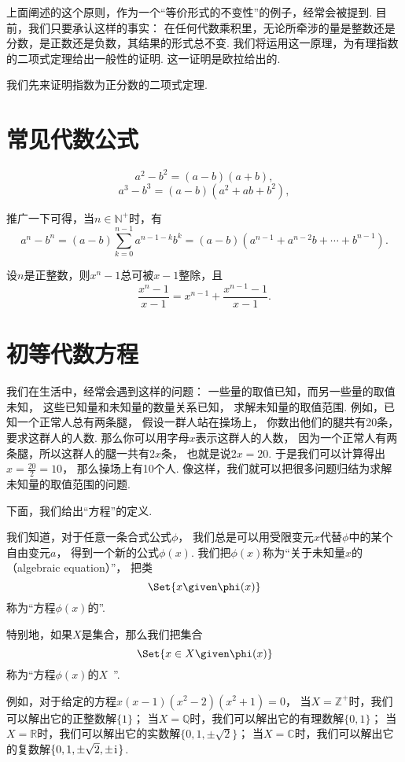 上面阐述的这个原则，作为一个“等价形式的不变性”的例子，经常会被提到.
目前，我们只要承认这样的事实：
在任何代数乘积里，无论所牵涉的量是整数还是分数，是正数还是负数，其结果的形式总不变.
我们将运用这一原理，为有理指数的二项式定理给出一般性的证明.
这一证明是欧拉给出的.

我们先来证明指数为正分数的二项式定理.

\section{常见代数公式}

\begin{theorem}
\[
a^2 - b^2 = (a-b)(a+b),
\]\[
a^3 - b^3 = (a-b)(a^2+ab+b^2),
\]

推广一下可得，当\(n \in \mathbb{N}^+\)时，有\[
a^n - b^n = (a-b) \sum_{k=0}^{n-1}{a^{n-1-k} b^k}
= (a-b)(a^{n-1} + a^{n-2} b + \dotsb + b^{n-1}).
\]
\end{theorem}

设\(n\)是正整数，则\(x^n-1\)总可被\(x-1\)整除，且\[
	\frac{x^n-1}{x-1}
	= x^{n-1} + \frac{x^{n-1}-1}{x-1}.
\]

\section{初等代数方程}
我们在生活中，经常会遇到这样的问题：
一些量的取值已知，而另一些量的取值未知，
这些已知量和未知量的数量关系已知，
求解未知量的取值范围.
例如，已知一个正常人总有两条腿，
假设一群人站在操场上，
你数出他们的腿共有20条，
要求这群人的人数.
那么你可以用字母\(x\)表示这群人的人数，
因为一个正常人有两条腿，所以这群人的腿一共有\(2x\)条，
也就是说\(2x=20\).
于是我们可以计算得出\(x=\frac{20}{2}=10\)，
那么操场上有10个人.
像这样，我们就可以把很多问题归结为求解未知量的取值范围的问题.

下面，我们给出“方程”的定义.

我们知道，对于任意一条合式公式\(\phi\)，
我们总是可以用受限变元\(x\)代替\(\phi\)中的某个自由变元\(a\)，
得到一个新的公式\(\phi(x)\).
我们把\(\phi(x)\)称为“关于未知量\(x\)的（algebraic equation）”，
把类\[
	\Set{ x \given \phi(x) }
\]称为“方程\(\phi(x)\)的”.

特别地，如果\(X\)是集合，那么我们把集合\[
	\Set{ x \in X \given \phi(x) }
\]称为“方程\(\phi(x)\)的\(X\)~”.

例如，对于给定的方程\(x(x-1)(x^2-2)(x^2+1)=0\)，
当\(X=\mathbb{Z}^+\)时，我们可以解出它的正整数解\(\{1\}\)；
当\(X=\mathbb{Q}\)时，我们可以解出它的有理数解\(\{0,1\}\)；
当\(X=\mathbb{R}\)时，我们可以解出它的实数解\(\{0,1,\pm\sqrt2\}\)；
当\(X=\mathbb{C}\)时，我们可以解出它的复数解\(\{0,1,\pm\sqrt2,\pm\kern1pt\mathrm{i}\kern1pt\}\).

